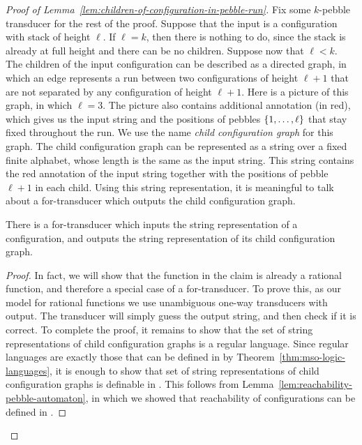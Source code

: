 \begin{proof}[Proof of Lemma~\ref{lem:children-of-configuration-in-pebble-run}] Fix some $k$-pebble transducer for the rest of the proof.   Suppose that the input is a configuration with stack of height $\ell$. If $\ell =k$, then there is nothing to do, since the stack is already at full height and there can be no children. Suppose now that $\ell < k$. The children of the input configuration can be  described as a directed graph, in which an edge represents a run between two configurations of height $\ell+1$ that are not separated by any configuration of height $\ell +1$. Here is a picture of this graph, in which $\ell=3$.
The picture also contains additional annotation (in red), which gives us the input string and the positions of pebbles $\{1,\ldots,\ell\}$ that stay fixed throughout the run. We use the name \emph{child configuration graph} for this graph. The child configuration graph can be represented as a string over a fixed finite alphabet, whose length is the same as the input string.  This string contains the red annotation of the input string together with the positions of pebble $\ell+1$ in each child. Using this string representation, it is meaningful to talk about a for-transducer which outputs the child configuration graph.

\begin{claim}\label{claim:from-configuration-to-child-configuration-graph}
    There is a for-transducer which inputs the string representation of a configuration, and outputs the  string representation of its child configuration graph. 
\end{claim}
\begin{proof}  In fact, we will show that the function in the claim is already a rational function, and therefore a special case of a for-transducer. To prove this, as our model for rational functions we use unambiguous one-way transducers with output. The transducer will simply guess the output string, and then check if it is correct. To complete the proof, it remains to show that the set of string representations of child configuration graphs is a regular language.
Since regular languages are exactly those that can be defined in \mso by Theorem~\ref{thm:mso-logic-languages}, it is enough to show that set of string representations of child configuration graphs is definable in \mso. This follows from  Lemma~\ref{lem:reachability-pebble-automaton}, in which we showed that  reachability of configurations can be defined in \mso. 
\end{proof}


\end{proof}
